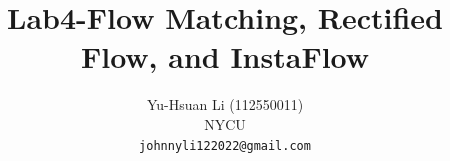 \documentclass[10pt,twocolumn,letterpaper]{article}
\title{Lab4-Flow Matching, Rectified Flow, and InstaFlow}
\author{Yu-Hsuan Li (112550011)\\
NYCU\\
{\tt\small johnnyli122022@gmail.com}
}
\begin{document}
\maketitle






{
    \small
    
    
}
\end{document}
